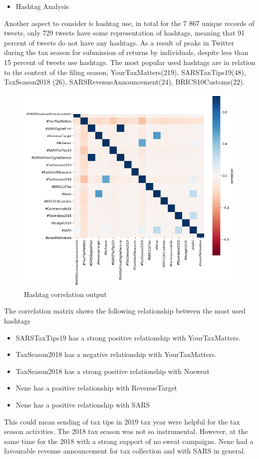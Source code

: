 \begin{itemize}
    \item Hashtag Analysis
\end{itemize}

Another aspect to consider is hashtag use, in total for the 7 867 unique records of tweets, only 729 tweets have some representation of hashtags, meaning that 91 percent of tweets do not have any hashtags.  As a result of peaks in Twitter during the tax season for submission of returns by individuals, despite less than 15 percent of tweets use hashtags. The most popular used hashtags are in relation to the context of the filing season, YourTaxMatters(219), SARSTaxTips19(48), TaxSeason2018 (26), SARSRevenueAnnouncement(24), BRICS10Customs(22).\\

\begin{figure}
    \centering
    \includegraphics[width=0.3\linewidth]{postgrad_template 2/chapters/chapter1/User Hashtag Correlation.png}
    \caption{Hashtag correlation output}
    \label{fig:Hashtag correlation for government user}
\end{figure}

The correlation matrix shows the following relationship between the most used hashtags
\begin{itemize}
    \item SARSTaxTips19 has a strong positive relationship with YourTaxMatters.  
    \item TaxSeason2018 has a negative relationship with YourTaxMatters.  
    \item TaxSeason2018 has a strong positive relationship with Nosweat
    \item  Nene has a positive relationship with RevenueTarget
    \item  Nene has a positive relationship with SARS 
\end{itemize}

This could mean sending of tax tips in 2019 tax year were helpful for the tax season activities.  The 2018 tax season was not so instrumental.  However, at the same time for the 2018 with a strong support of no sweat campaigns.  Nene had a favourable revenue announcement for tax collection and with SARS in general.


